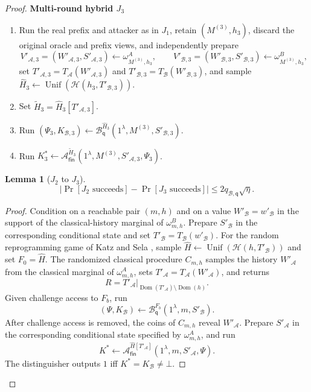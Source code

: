\documentclass[11pt]{article}
\newtheorem{lemma}[lemma]{Lemma}
\newcommand{\cA}{\mathcal{A}}
\newcommand{\cB}{\mathcal{B}}
\newcommand{\cH}{\mathcal{H}}
\newcommand{\Dom}{\operatorname{Dom}}
\newcommand{\Unif}{\operatorname{Unif}}
\newcommand{\changed}[1]{\textcolor{purple!75!black}{#1}}
\newcommand{\mrchanged}[1]{\changed{#1}}
\newenvironment{hybrid}[1]{%
  \par\medskip
  \noindent\textbf{#1}
  \begin{enumerate}[leftmargin=2.5em,label=\arabic*.,itemsep=0.25em,topsep=0.35em]
}{%
  \end{enumerate}
  \medskip
}
\begin{document}
\begin{proof}
\begin{hybrid}{Multi-round hybrid \(J_3\)}
  \item Run the real prefix and attacker as in \(J_1\), retain
  \((M^{(3)},h_3)\), discard the original oracle and prefix views, and
  independently prepare
  \[
    V'_{\cA,3}=(W'_{\cA,3},S'_{\cA,3})
      \leftarrow\omega^A_{M^{(3)},h_3},
    \qquad
    V'_{\cB,3}=(W'_{\cB,3},S'_{\cB,3})
      \leftarrow\omega^B_{M^{(3)},h_3},
  \]
  set \(T'_{\cA,3}=T_{\cA}(W'_{\cA,3})\) and
  \(T'_{\cB,3}=T_{\cB}(W'_{\cB,3})\), and sample
  \(\widehat H_3\leftarrow\Unif(\cH(h_3,T'_{\cB,3}))\).
  \item Set \(\widetilde H_3=\widehat H_3[T'_{\cA,3}]\).
  \item \mrchanged{Run
  \((\Psi_3,K_{\cB,3})\leftarrow
    \cB_{\mathsf q}^{\widehat H_3}
    (1^\lambda,M^{(3)},S'_{\cB,3})\).}
  \item Run
  \(K^*_3\leftarrow
    \cA_{\mathsf{fin}}^{\widetilde H_3}
    (1^\lambda,M^{(3)},S'_{\cA,3},\Psi_3)\).
\end{hybrid}

\begin{lemma}[\(J_2\) to \(J_3\)]
\label{lem:multi-j2-j3}
\[
  \left|
    \Pr[J_2\text{ succeeds}]-\Pr[J_3\text{ succeeds}]
  \right|
  \le2q_{\cB,\mathsf q}\sqrt\eta.
\]
\end{lemma}

\begin{proof}
Condition on a reachable pair \((m,h)\) and on a value
\(W'_{\cB}=w'_{\cB}\) in the support of the classical-history marginal of
\(\omega^B_{m,h}\). Prepare \(S'_{\cB}\) in the corresponding conditional
state and set \(T'_{\cB}=T_{\cB}(w'_{\cB})\).
For the random reprogramming game of Katz and Sela
\cite[Lemma~3]{KatzSela24}, sample
\(\widehat H\leftarrow\Unif(\cH(h,T'_{\cB}))\) and set
\(F_0=\widehat H\). The randomized classical procedure \(C_{m,h}\) samples
the history \(W'_{\cA}\) from the classical marginal of
\(\omega^A_{m,h}\), sets \(T'_{\cA}=T_{\cA}(W'_{\cA})\), and returns
\[
  R
  =
  T'_{\cA}
  \big|_{\Dom(T'_{\cA})\setminus\Dom(h)}.
\]
Given challenge access to \(F_b\), run
\[
  (\Psi,K_{\cB})
  \leftarrow
  \cB_{\mathsf q}^{F_b}(1^\lambda,m,S'_{\cB}).
\]
After challenge access is removed, the coins of \(C_{m,h}\) reveal
\(W'_{\cA}\). Prepare \(S'_{\cA}\) in the corresponding conditional
state specified by \(\omega^A_{m,h}\), and run
\[
  K^*
  \leftarrow
  \cA_{\mathsf{fin}}^{\widehat H[T'_{\cA}]}
  (1^\lambda,m,S'_{\cA},\Psi).
\]
The distinguisher outputs \(1\) iff \(K^*=K_{\cB}\neq\bot\).


\end{proof}
\end{proof}
\end{document}
